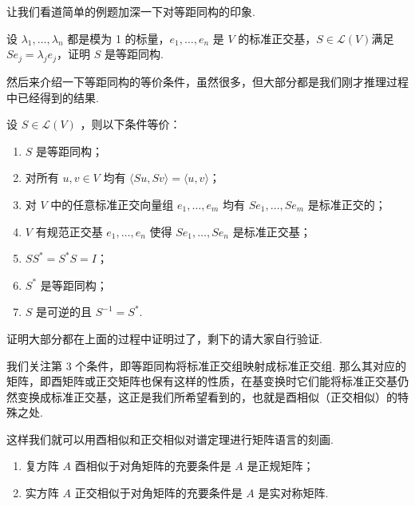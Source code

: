 让我们看道简单的例题加深一下对等距同构的印象.
\begin{example} \label{ex:25:等距同构}
    设 $ \lambda_1, \ldots , \lambda_n $ 都是模为 1 的标量，$ e_1, \ldots , e_n $ 是 $ V $ 的标准正交基，$ S \in \mathcal{L}(V) $满足 $ Se_j = \lambda_je_j $，证明 $ S $ 是等距同构.
\end{example}

然后来介绍一下等距同构的等价条件，虽然很多，但大部分都是我们刚才推理过程中已经得到的结果.

\begin{theorem}
    设 $ S \in \mathcal{L}(V) $ ，则以下条件等价：
    \begin{enumerate}
        \item $ S $ 是等距同构；

        \item 对所有 $ u, v \in V $ 均有 $ \langle Su, Sv \rangle = \langle u, v \rangle $；

        \item 对 $ V $ 中的任意标准正交向量组 $ e_1, \ldots , e_m $ 均有 $ Se_1, \ldots , Se_m $ 是标准正交的；

        \item $ V $ 有规范正交基 $ e_1, \ldots ,e_n $ 使得 $ Se_1, \ldots , Se_n $ 是标准正交基；

        \item $ SS^* = S^*S = I $；

        \item $ S^* $ 是等距同构；

        \item $ S $ 是可逆的且 $ S^{-1} = S^* $.
    \end{enumerate}
\end{theorem}

证明大部分都在上面的过程中证明过了，剩下的请大家自行验证.

我们关注第 3 个条件，即等距同构将标准正交组映射成标准正交组. 那么其对应的矩阵，即酉矩阵或正交矩阵也保有这样的性质，在基变换时它们能将标准正交基仍然变换成标准正交基，这正是我们所希望看到的，也就是酉相似（正交相似）的特殊之处.

这样我们就可以用酉相似和正交相似对谱定理进行矩阵语言的刻画.

\begin{theorem}
    \begin{enumerate}
        \item 复方阵 $ A $ 酉相似于对角矩阵的充要条件是 $ A $ 是正规矩阵；

        \item 实方阵 $ A $ 正交相似于对角矩阵的充要条件是 $ A $ 是实对称矩阵.
    \end{enumerate}
\end{theorem}

